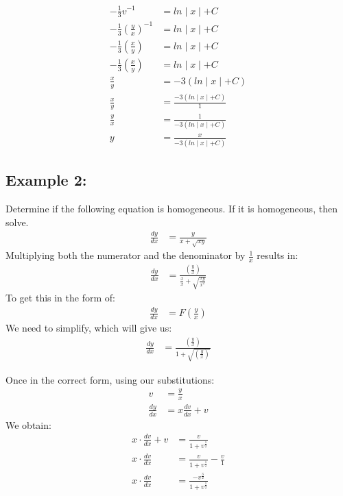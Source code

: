 \documentclass{article}
\begin{document}
\begin{flushleft}
{\begin{align*}
-\frac{1}{3}v^{-1} & = ln\mid x \mid + C \\
-\frac{1}{3}(\frac{y}{x})^{-1} & = ln\mid x \mid + C \\
-\frac{1}{3}(\frac{x}{y}) & = ln\mid x \mid + C \\
-\frac{1}{3}(\frac{x}{y}) & = ln\mid x \mid + C \\
\frac{x}{y} & = -3 (ln\mid x \mid + C) \\
\frac{x}{y} & = \frac{ -3 (ln\mid x \mid + C) }{1} \\
\frac{y}{x} & = \frac{1}{ -3 (ln\mid x \mid + C) } \\
y & =  \frac{x}{ -3 (ln\mid x \mid + C) } 
\end{align*}


\subsection*{\textbf{Example 2:}}
Determine if the following equation is homogeneous. If it is homogeneous, then solve.
\begin{align*}
\frac{dy}{dx} & = \frac{y}{x +\sqrt{xy}}
\end{align*}
Multiplying both the numerator and the denominator by $\frac{1}{x}$ results in:\\
\begin{align*}
\frac{dy}{dx} & = \frac{(\frac{y}{x})}{\frac{x}{x} +\sqrt{\frac{xy}{x^2}}}
\end{align*}
To get this in the form of:
\begin{align*}
\frac{dy}{dx} & = F (\frac{y}{x})
\end{align*}
We need to simplify, which will give us:\\
\begin{align*}
\frac{dy}{dx} & = \frac{(\frac{y}{x})}{1 +\sqrt{(\frac{y}{x})}}
\end{align*}

Once in the correct form, using our substitutions:\\
\begin{align*}
v & = \frac{y}{x}\\
\frac{dy}{dx} & = x \frac{dv}{dx} + v
 \end{align*}
We obtain:\\
\begin{align*}
x \cdot \frac{dv}{dx} + v & = \frac{v}{1 + v^\frac{1}{2}}\\
x \cdot  \frac{dv}{dx}  & = \frac{v}{1 + v^\frac{1}{2}} - \frac{v}{1}\\
x \cdot  \frac{dv}{dx}  & = \frac{-v^\frac{3}{2}}{1 + v^\frac{1}{2}}
\end{align*}

}
\end{flushleft}
\end{document}
